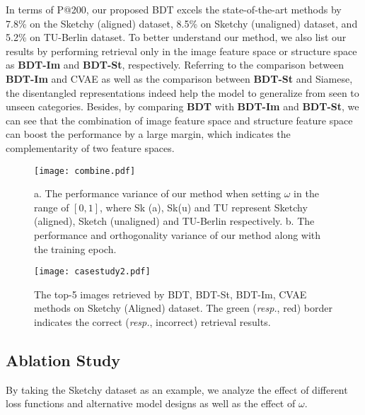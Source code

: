 \documentclass[10pt,twocolumn,letterpaper]{article}
\begin{document}
In terms of P@200, our proposed BDT excels the state-of-the-art methods by 7.8\% on the Sketchy (aligned) dataset, 8.5\% on Sketchy (unaligned) dataset, and 5.2\% on TU-Berlin dataset. 
To better understand our method, we also list our results by performing retrieval only in the image feature space or structure space as \textbf{BDT-Im} and \textbf{BDT-St}, respectively. Referring to the comparison between \textbf{BDT-Im} and CVAE as well as the comparison between \textbf{BDT-St} and Siamese, the disentangled representations indeed help the model to generalize from seen to unseen categories. 
Besides, by comparing \textbf{BDT} with \textbf{BDT-Im} and \textbf{BDT-St}, we can see that the combination of image feature space and structure feature space can boost the performance by a large margin, which indicates the complementarity of two feature spaces.

\begin{figure}
\begin{center}
\texttt{[image: combine.pdf]}
\end{center}
\vspace{-15pt}
   \caption{a. The performance variance of our method when setting $\omega$ in the range of $[0, 1]$, where Sk (a), Sk(u) and TU represent Sketchy (aligned), Sketch (unaligned) and TU-Berlin respectively. b. The performance and orthogonality variance of our method along with the training epoch.}
\label{fig:orth}
\vspace{-15pt}
\end{figure}

\begin{figure*}
\begin{center}
\texttt{[image: casestudy2.pdf]}
\end{center}
\vspace{-10pt}
   \caption{The top-5 images retrieved by BDT, BDT-St, BDT-Im, CVAE methods on Sketchy (Aligned) dataset. The green (\emph{resp.}, red) border indicates the correct (\emph{resp.}, incorrect) retrieval results.}
\label{fig:case}
\vspace{-14pt}
\end{figure*}

\subsection{Ablation Study}
By taking the Sketchy dataset as an example, we analyze the effect of different loss functions and alternative model designs as well as the effect of $\omega$.
\end{document}
